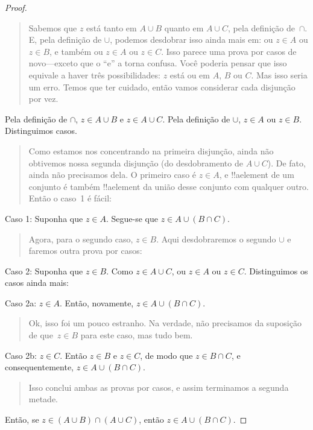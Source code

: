 \documentclass[../../../include/open-logic-section]{subfiles}
\begin{document}
\begin{proof}
\begin{quote}
Sabemos que $z$ está tanto em $A \cup B$ quanto em $A \cup C$, pela definição
de~$\cap$. E, pela definição de $\cup$, podemos desdobrar isso ainda mais
em: ou $z \in A$ ou $z \in B$, e também ou $z \in A$ ou $z \in
C$. Isso parece uma prova por casos de novo---exceto que o ``e'' a torna
confusa. Você poderia pensar que isso equivale a haver três
possibilidades: $z$ está ou em $A$, $B$ ou $C$. Mas isso seria um
erro.  Temos que ter cuidado, então vamos considerar cada disjunção por
vez.
\end{quote}
Pela definição de $\cap$, $z \in A \cup B$ e $z \in A \cup C$. Pela
definição de $\cup$, $z \in A$ ou $z \in B$. Distinguimos casos.
\begin{quote}
Como estamos nos concentrando na primeira disjunção, ainda não obtivemos nossa
segunda disjunção (do desdobramento de $A \cup C$). De fato, ainda não
precisamos dela. O primeiro caso é $z \in A$, e !!a{element} de um conjunto é
também !!a{element} da união desse conjunto com qualquer outro. Então o caso~1
é fácil:
\end{quote}
Caso 1: Suponha que $z \in A$. Segue-se que $z \in A \cup (B \cap
C)$.
\begin{quote}
Agora, para o segundo caso, $z \in B$. Aqui desdobraremos o segundo
$\cup$ e faremos outra prova por casos:
\end{quote}
Caso 2: Suponha que $z \in B$. Como $z \in A \cup C$, ou $z \in
A$ ou $z \in C$. Distinguimos os casos ainda mais:

Caso 2a: $z \in A$. Então, novamente, $z \in A \cup (B \cap C)$.
\begin{quote}
Ok, isso foi um pouco estranho. Na verdade, não precisamos da suposição
de que~$z \in B$ para este caso, mas tudo bem.
\end{quote}
Caso 2b: $z \in C$. Então $z \in B$ e $z \in C$, de modo que $z \in B \cap C$,
e consequentemente, $z \in A \cup (B \cap C)$.
\begin{quote}
Isso conclui ambas as provas por casos, e assim terminamos a segunda
metade.
\end{quote}
Então, se $z \in (A \cup B) \cap (A \cup C)$, então $z \in A \cup (B \cap C)$.
\end{proof}
\end{document}
